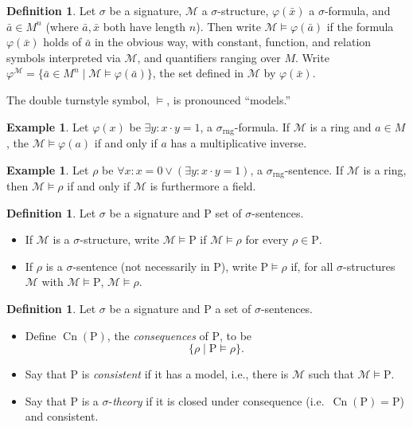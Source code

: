 \documentclass{article}
\theoremstyle{plain}
\theoremstyle{definition}
\newtheorem{defn}[thm]{Definition}
\newtheorem{example}[thm]{Example}
\newcommand{\defterm}{\emph}
\newcommand{\ringsig}{\sigma_{\operatorname{rng}}}
\newcommand{\tuple}{\bar}
\DeclareMathOperator{\Cn}{Cn}
\newcommand{\Rho}{\mathrm{P}}
\renewcommand{\phi}{\varphi}
\begin{document}
\begin{defn}
  Let $\sigma$ be a signature, $\mathcal{M}$ a $\sigma$-structure,
  $\phi(\tuple{x})$ a $\sigma$-formula, and $\tuple{a} \in M^n$ (where
  $\tuple{a}, \tuple{x}$ both have length $n$). Then write
  $\mathcal{M} \models \phi(\tuple{a})$ if the formula
  $\phi(\tuple{x})$ holds of $\tuple{a}$ in the obvious way, with
  constant, function, and relation symbols interpreted via
  $\mathcal{M}$, and quantifiers ranging over $M$. Write
  $\phi^\mathcal{M} = \{ \tuple{a} \in M^n \mid \mathcal{M} \models
  \phi(\tuple{a})\}$, the set defined in $\mathcal{M}$ by
  $\phi(\tuple{x})$.

  The double turnstyle symbol, $\models$, is pronounced ``models.''
\end{defn}

\begin{example}
  Let $\phi(x)$ be $\exists y: x \cdot y = 1$, a
  $\ringsig$-formula. If $\mathcal{M}$ is a ring and $a \in M$, the
  $\mathcal{M} \models \phi(a)$ if and only if $a$ has a
  multiplicative inverse.
\end{example}

\begin{example}
  Let $\rho$ be $\forall x: x = 0 \vee (\exists y: x \cdot y = 1)$, a
  $\ringsig$-sentence. If $\mathcal{M}$ is a ring, then $\mathcal{M}
  \models \rho$ if and only if $\mathcal{M}$ is furthermore a field.
\end{example}

\begin{defn}
  Let $\sigma$ be a signature and $\Rho$ set of $\sigma$-sentences.
  \begin{itemize}
  \item If $\mathcal{M}$ is a $\sigma$-structure, write $\mathcal{M}
    \models \Rho$ if $\mathcal{M} \models \rho$ for every $\rho \in
    \Rho$.
  \item If $\mathcal{\rho}$ is a $\sigma$-sentence (not necessarily in
    $\Rho$), write $\Rho \models \rho$ if, for all $\sigma$-structures
    $\mathcal{M}$ with $\mathcal{M} \models \Rho$, $\mathcal{M}
    \models \rho$.
  \end{itemize}
\end{defn}

\begin{defn}
  Let $\sigma$ be a signature and $\Rho$ a set of $\sigma$-sentences.
  \begin{itemize}
  \item Define $\Cn(\Rho)$, the \defterm{consequences} of $\Rho$, to
    be $$\{\rho \mid \Rho \models \rho\}\text{.}$$
  \item Say that $\Rho$ is \defterm{consistent} if it has a model,
    i.e., there is $\mathcal{M}$ such that $\mathcal{M} \models \Rho$.
  \item Say that $\Rho$ is a $\sigma$-\defterm{theory} if it is closed
    under consequence (i.e.\ $\Cn(\Rho) = \Rho$) and consistent.
  \end{itemize}
\end{defn}
\end{document}
